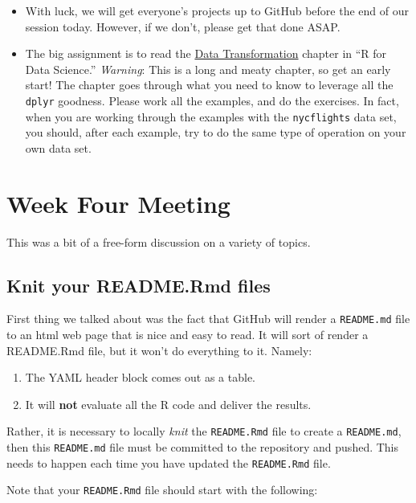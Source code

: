 \documentclass[]{book}
\providecommand{\tightlist}{%
  \setlength{\itemsep}{0pt}\setlength{\parskip}{0pt}}
\theoremstyle{definition}
\theoremstyle{definition}
\theoremstyle{remark}
\begin{document}
\begin{itemize}
\tightlist
\item
  With luck, we will get everyone's projects up to GitHub before the end
  of our session today. However, if we don't, please get that done ASAP.
\item
  The big assignment is to read the
  \href{http://r4ds.had.co.nz/transform.html}{Data Transformation}
  chapter in ``R for Data Science.'' \emph{Warning}: This is a long and
  meaty chapter, so get an early start! The chapter goes through what
  you need to know to leverage all the \texttt{dplyr} goodness. Please
  work all the examples, and do the exercises. In fact, when you are
  working through the examples with the \texttt{nycflights} data set,
  you should, after each example, try to do the same type of operation
  on your own data set.
\end{itemize}

\chapter{Week Four Meeting}\label{week4}

This was a bit of a free-form discussion on a variety of topics.

\section{Knit your README.Rmd files}\label{knit-your-readme.rmd-files}

First thing we talked about was the fact that GitHub will render a
\texttt{README.md} file to an html web page that is nice and easy to
read. It will sort of render a README.Rmd file, but it won't do
everything to it. Namely:

\begin{enumerate}
\def\labelenumi{\arabic{enumi}.}
\tightlist
\item
  The YAML header block comes out as a table.
\item
  It will \textbf{not} evaluate all the R code and deliver the results.
\end{enumerate}

Rather, it is necessary to locally \emph{knit} the \texttt{README.Rmd}
file to create a \texttt{README.md}, then this \texttt{README.md} file
must be committed to the repository and pushed. This needs to happen
each time you have updated the \texttt{README.Rmd} file.

Note that your \texttt{README.Rmd} file should start with the following:
\end{document}
